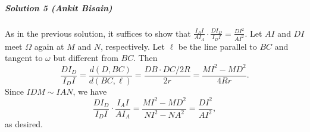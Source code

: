 \subparagraph{Solution 5 (Ankit Bisain)}

As in the previous solution, it suffices to show that $\frac{I_AI}{AI_A}\cdot
\frac{DI_D}{I_DI} = \frac{DI^2}{AI^2}$. Let $AI$ and $DI$ meet $\Omega$ again at
$M$ and $N$, respectively. Let $\ell$ be the line parallel to $BC$ and tangent
to $\omega$ but different from $BC$. Then
\[
  \frac{DI_D}{I_DI}=\frac{d(D, BC)}{d(BC, \ell)} = \frac{DB\cdot DC/2R}{2r} =
  \frac{MI^2-MD^2}{4Rr}.
\]
Since $IDM\sim IAN$, we have
\[\frac{DI_D}{I_DI}\cdot \frac{I_AI}{AI_A} =
\frac{MI^2-MD^2}{NI^2-NA^2}=\frac{DI^2}{AI^2},\]
as desired.

%
%

